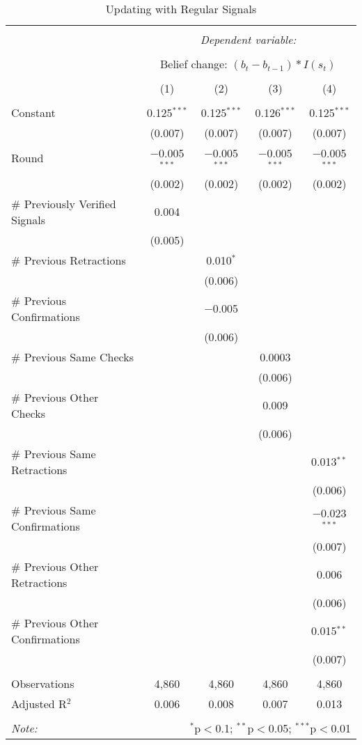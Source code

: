 
\begin{table}[!htbp] \centering \small
  \caption{Updating with Regular Signals} 
  \label{tab:regular_verifications_belief_change} 
\begin{tabular}{@{\extracolsep{5pt}}lcccc} 
\\[-1.8ex]\hline 
\hline \\[-1.8ex] 
 & \multicolumn{4}{c}{\textit{Dependent variable:}} \\ 
\cline{2-5} 
\\[-1.8ex] & \multicolumn{4}{c}{Belief change: $(b_t-b_{t-1})*I(s_t)$} \\ 
\\[-1.8ex] & (1) & (2) & (3) & (4)\\ 
\hline \\[-1.8ex] 
 Constant & 0.125$^{***}$ & 0.125$^{***}$ & 0.126$^{***}$ & 0.125$^{***}$ \\ 
  & (0.007) & (0.007) & (0.007) & (0.007) \\ 
  Round & $-$0.005$^{***}$ & $-$0.005$^{***}$ & $-$0.005$^{***}$ & $-$0.005$^{***}$ \\ 
  & (0.002) & (0.002) & (0.002) & (0.002) \\ 
  \# Previously Verified Signals & 0.004 &  &  &  \\ 
  & (0.005) &  &  &  \\ 
  \# Previous Retractions &  & 0.010$^{*}$ &  &  \\ 
  &  & (0.006) &  &  \\ 
  \# Previous Confirmations &  & $-$0.005 &  &  \\ 
  &  & (0.006) &  &  \\ 
  \# Previous Same Checks &  &  & 0.0003 &  \\ 
  &  &  & (0.006) &  \\ 
  \# Previous Other Checks &  &  & 0.009 &  \\ 
  &  &  & (0.006) &  \\ 
  \# Previous Same Retractions &  &  &  & 0.013$^{**}$ \\ 
  &  &  &  & (0.006) \\ 
  \# Previous Same Confirmations &  &  &  & $-$0.023$^{***}$ \\ 
  &  &  &  & (0.007) \\ 
  \# Previous Other Retractions &  &  &  & 0.006 \\ 
  &  &  &  & (0.006) \\ 
  \# Previous Other Confirmations &  &  &  & 0.015$^{**}$ \\ 
  &  &  &  & (0.007) \\ 
 \hline \\[-1.8ex] 
Observations & 4,860 & 4,860 & 4,860 & 4,860 \\ 
Adjusted R$^{2}$ & 0.006 & 0.008 & 0.007 & 0.013 \\ 
\hline 
\hline \\[-1.8ex] 
\textit{Note:}  & \multicolumn{4}{r}{$^{*}$p$<$0.1; $^{**}$p$<$0.05; $^{***}$p$<$0.01} \\ 
\end{tabular} 
\end{table} 
